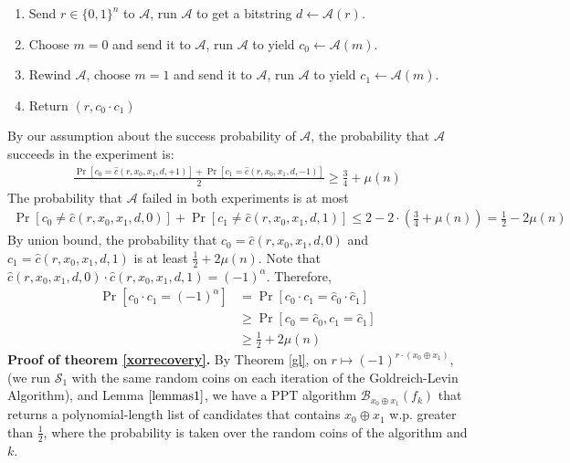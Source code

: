 \documentclass{article}
\begin{document}
\begin{enumerate}
    \item Send $r\in\{0,1\}^{n}$ to $\mathcal{A}$, run $\mathcal{A}$ to get a bitstring $d\leftarrow \mathcal{A}(r)$.
    \item Choose $m=0$ and send it to $\mathcal{A}$, run $\mathcal{A}$ to yield $c_{0}\leftarrow\mathcal{A}(m)$.
    \item Rewind $\mathcal{A}$, choose $m=1$ and send it to $\mathcal{A}$, run $\mathcal{A}$ to yield $c_{1}\leftarrow\mathcal{A}(m)$.
    \item Return $(r, c_{0}\cdot c_{1})$
\end{enumerate} By our assumption about the success probability of $\mathcal{A}$, the probability that $\mathcal{A}$ succeeds in the experiment is:
\begin{align}\frac{\Pr[c_{0} = \hat{c}(r,x_{0},x_{1},d,+1)] + \Pr[c_{1} = \hat{c}(r,x_{0},x_{1},d,-1)]}{2} \geq \frac{3}{4}+\mu(n)\end{align}  The probability that $\mathcal{A}$ failed in both experiments is at most
\begin{align}\Pr[c_{0} \neq \hat{c}(r,x_{0},x_{1},d,0)] + \Pr[c_{1} \neq \hat{c}(r,x_{0},x_{1},d,1)]\leq 2 - 2\cdot \left(\frac{3}{4} + \mu(n)\right) = \frac{1}{2} - 2\mu(n)\end{align}  By union bound, the probability that $c_{0}=\hat{c}(r,x_{0},x_{1},d,0)$ and $c_{1}=\hat{c}(r,x_{0},x_{1},d,1)$ is at least $\frac{1}{2}+2\mu(n)$. Note that $\hat{c}(r,x_{0},x_{1},d,0)\cdot \hat{c}(r,x_{0},x_{1},d,1)=(-1)^{\alpha}$. Therefore,
\begin{align}
    \Pr[c_{0}\cdot c_{1}=(-1)^{\alpha}] &= \Pr[c_{0}\cdot c_{1} = \hat{c}_{0}\cdot \hat{c}_{1}]\\
    &\geq \Pr[c_{0}=\hat{c}_{0}, c_{1}=\hat{c}_{1}]\\
    &\geq \frac{1}{2}+2\mu(n)
\end{align} \textbf{Proof of theorem \ref{xorrecovery}.} 
By Theorem \ref{gl}, on $r\mapsto(-1)^{r\cdot (x_{0} \oplus x_{1})}$, (we run $\mathcal{S}_{1}$ with the same random coins on each iteration of the Goldreich-Levin Algorithm), and Lemma $\ref{lemmas1}$, we have a $\mathrm{PPT}$ algorithm $\mathcal{B}_{x_{0}\oplus x_{1}}(f_{k})$ that returns a polynomial-length list of candidates that contains $x_{0}\oplus x_{1}$ w.p. greater than $\frac{1}{2}$, where the probability is taken over the random coins of the algorithm and $k$.
\end{document}
